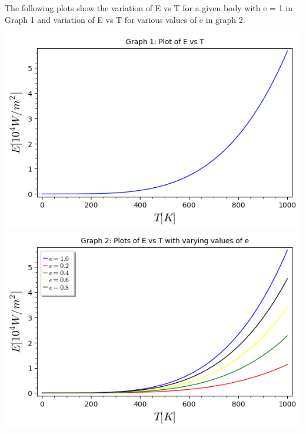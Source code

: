 The following plots show the variation of E vs T for a given body with e = 1 in Graph 1 and variation of E vs T for various values of e in graph 2.

\includegraphics[scale=0.6]{jan-may-2022-latex/AE21B107/EvsT.png}
\includegraphics[scale=0.6]{jan-may-2022-latex/AE21B107/variable_e.png}
